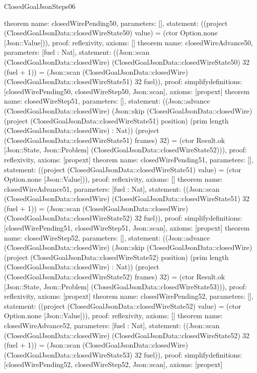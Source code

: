\begin{lexlean}{ClosedGoalJsonSteps06}
\begin{semanticmodule}
{}
theorem{
 name: closedWirePending50, parameters: [],
 statement: ((project (ClosedGoalJsonData::closedWireState50) value) = (ctor Option.none [Json::Value])), proof: reflexivity{}, axioms: []
}
theorem{
 name: closedWireAdvance50, parameters: [fuel : Nat],
 statement: ((Json::scan (ClosedGoalJsonData::closedWire) (ClosedGoalJsonData::closedWireState50) 32 (fuel + 1)) = (Json::scan (ClosedGoalJsonData::closedWire) (ClosedGoalJsonData::closedWireState51) 32 fuel)), proof: simplify{definitions: [closedWirePending50, closedWireStep50, Json::scan]}, axioms: [propext]
}
theorem{
 name: closedWireStep51, parameters: [],
 statement: ((Json::advance (ClosedGoalJsonData::closedWire) (Json::skip (ClosedGoalJsonData::closedWire) (project (ClosedGoalJsonData::closedWireState51) position) (prim length (ClosedGoalJsonData::closedWire) : Nat)) (project (ClosedGoalJsonData::closedWireState51) frames) 32) = (ctor Result.ok [Json::State, Json::Problem] (ClosedGoalJsonData::closedWireState52))), proof: reflexivity{}, axioms: [propext]
}
theorem{
 name: closedWirePending51, parameters: [],
 statement: ((project (ClosedGoalJsonData::closedWireState51) value) = (ctor Option.none [Json::Value])), proof: reflexivity{}, axioms: []
}
theorem{
 name: closedWireAdvance51, parameters: [fuel : Nat],
 statement: ((Json::scan (ClosedGoalJsonData::closedWire) (ClosedGoalJsonData::closedWireState51) 32 (fuel + 1)) = (Json::scan (ClosedGoalJsonData::closedWire) (ClosedGoalJsonData::closedWireState52) 32 fuel)), proof: simplify{definitions: [closedWirePending51, closedWireStep51, Json::scan]}, axioms: [propext]
}
theorem{
 name: closedWireStep52, parameters: [],
 statement: ((Json::advance (ClosedGoalJsonData::closedWire) (Json::skip (ClosedGoalJsonData::closedWire) (project (ClosedGoalJsonData::closedWireState52) position) (prim length (ClosedGoalJsonData::closedWire) : Nat)) (project (ClosedGoalJsonData::closedWireState52) frames) 32) = (ctor Result.ok [Json::State, Json::Problem] (ClosedGoalJsonData::closedWireState53))), proof: reflexivity{}, axioms: [propext]
}
theorem{
 name: closedWirePending52, parameters: [],
 statement: ((project (ClosedGoalJsonData::closedWireState52) value) = (ctor Option.none [Json::Value])), proof: reflexivity{}, axioms: []
}
theorem{
 name: closedWireAdvance52, parameters: [fuel : Nat],
 statement: ((Json::scan (ClosedGoalJsonData::closedWire) (ClosedGoalJsonData::closedWireState52) 32 (fuel + 1)) = (Json::scan (ClosedGoalJsonData::closedWire) (ClosedGoalJsonData::closedWireState53) 32 fuel)), proof: simplify{definitions: [closedWirePending52, closedWireStep52, Json::scan]}, axioms: [propext]
}
\end{semanticmodule}
\end{lexlean}
